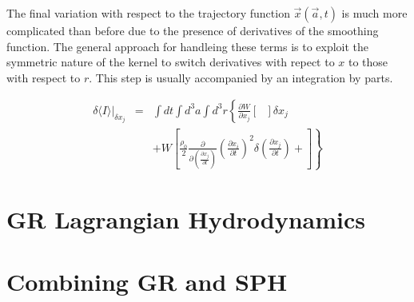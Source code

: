 The final variation with respect to the trajectory function ${\vec x}({\vec a},t)$ is much more complicated than before due to the presence of derivatives of the smoothing function.  The general approach for handleing these terms is to exploit the symmetric nature of the kernel to switch derivatives with repect to $x$ to those with respect to $r$.  This step is usually accompanied by an integration by parts.  

\begin{eqnarray}
\delta \langle I \rangle \vert_{\delta x_j} & = & \int \! dt \int \! d^3a \int \! d^3r \left\{ \frac{\partial W}{\partial x_j} \left[ \ \ \ \right] \delta x_j \right. \nonumber \\ 
& & \left. + W \left[ \frac{\rho_0}{2} \frac{\partial}{\partial \left(\frac{\partial x_j}{\partial t}\right)} \left( \frac{\partial x_i}{\partial t} \right)^2 \delta \left( \frac{\partial x_j}{\partial t} \right) +  \right] \right\}
\end{eqnarray}

\section{GR Lagrangian Hydrodynamics}\label{grhydro}



\section{Combining GR and SPH}\label{grsph}








